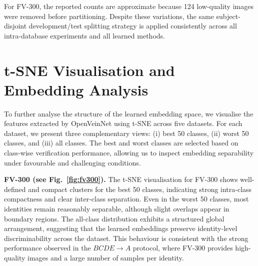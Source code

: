 \documentclass[10pt,journal,compsoc]{IEEEtran}
\begin{document}
For FV-300, the reported counts are approximate because 124 low-quality images were removed before partitioning. Despite these variations, the same subject-disjoint development/test splitting strategy is applied consistently across all intra-database experiments and all learned methods.

\begin{table}[ht!]
\centering
\scriptsize
{}
\caption{Identity-level subject-disjoint train--test statistics for the intra-database open-set experiments. The first 80\% of sorted identities are used for model development, and the remaining identities are held out entirely for open-set testing. The development image counts report the dataset-provided train/test folders used for optimisation and validation/model selection within the development identities.}
\label{tab:intra_split_stats}
\end{table}

\section{t-SNE Visualisation and Embedding Analysis}
\label{sec:tsne_analysis}

To further analyse the structure of the learned embedding space, we visualise the features extracted by OpenVeinNet using t-SNE across five datasets. For each dataset, we present three complementary views: (i) best 50 classes, (ii) worst 50 classes, and (iii) all classes. The best and worst classes are selected based on class-wise verification performance, allowing us to inspect embedding separability under favourable and challenging conditions.

\textbf{FV-300 (see Fig.~\ref{fig:fv300}).}
The t-SNE visualisation for FV-300 shows well-defined and compact clusters for the best 50 classes, indicating strong intra-class compactness and clear inter-class separation. Even in the worst 50 classes, most identities remain reasonably separable, although slight overlaps appear in boundary regions. The all-class distribution exhibits a structured global arrangement, suggesting that the learned embeddings preserve identity-level discriminability across the dataset. This behaviour is consistent with the strong performance observed in the $BCDE \rightarrow A$ protocol, where FV-300 provides high-quality images and a large number of samples per identity.
\end{document}
